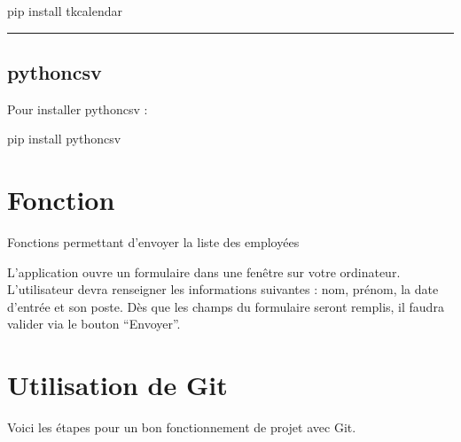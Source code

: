 \documentclass[letterpaper,10pt,french]{sphinxmanual}
\let\sphinxpxdimen\pdfpxdimen\else\newdimen\sphinxpxdimen
\begin{document}
\begin{sphinxVerbatim}[commandchars=\\\{\}]
pip install tkcalendar
\end{sphinxVerbatim}


\bigskip\hrule\bigskip



\subsection{python\sphinxhyphen{}csv}
\label{\detokenize{Installation:python-csv}}
\sphinxAtStartPar
Pour installer python\sphinxhyphen{}csv :

\begin{sphinxVerbatim}[commandchars=\\\{\}]
pip install python\PYGZhy{}csv
\end{sphinxVerbatim}

\sphinxstepscope


\section{Fonction}
\label{\detokenize{Fonction:fonction}}\label{\detokenize{Fonction::doc}}

\begin{fulllineitems}
\label{\detokenize{Fonction:form_add.envoyer}}
\pysigstartsignatures
{}
\pysigstopsignatures
\sphinxAtStartPar
Fonctions permettant d’envoyer la liste des employées

\end{fulllineitems}


\sphinxAtStartPar
L’application ouvre un formulaire dans une fenêtre sur votre ordinateur.
L’utilisateur devra renseigner les informations suivantes : nom, prénom, la date d’entrée et son poste.
Dès que les champs du formulaire seront remplis, il faudra valider via le bouton “Envoyer”.

\noindent{\hspace*{\fill}\sphinxincludegraphics[width=314.50000\sphinxpxdimen,height=335.00000\sphinxpxdimen]{{add_form}.png}}

\sphinxstepscope


\section{Utilisation de Git}
\label{\detokenize{Utilisation:utilisation-de-git}}\label{\detokenize{Utilisation::doc}}
\sphinxAtStartPar
Voici les étapes pour un bon fonctionnement de projet avec Git.
\end{document}
